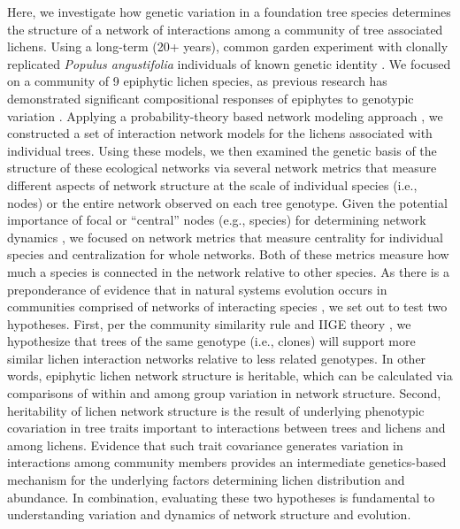 \documentclass[fleqn,12pt]{olplainarticle}
\begin{document}
Here, we investigate how genetic variation in a foundation tree
species determines the structure of a network of interactions among a
community of tree associated lichens.  Using a long-term (20+ years),
common garden experiment with clonally replicated \textit{Populus
  angustifolia} individuals of known genetic identity
\citep{Martinsen2001HybridSpecies}. We focused on a community of 9
epiphytic lichen species, as previous research has demonstrated
significant compositional responses of epiphytes to genotypic
variation \citep{Winfree2011, Zytynska2011}. Applying a
probability-theory based network modeling approach \citep{Araujo2011},
we constructed a set of interaction network models for the lichens
associated with individual trees. Using these models, we then examined
the genetic basis of the structure of these ecological networks via
several network metrics that measure different aspects of network
structure at the scale of individual species (i.e., nodes) or the
entire network observed on each tree genotype. Given the potential
importance of focal or ``central'' nodes (e.g., species) for
determining network dynamics \citep{Lieberman2005EvolutionaryGraphs},
we focused on network metrics that measure centrality for individual
species and centralization for whole networks. Both of these metrics
measure how much a species is connected in the network relative to
other species. As there is a preponderance of evidence that in natural
systems evolution occurs in communities comprised of networks of
interacting species \citep{Lau2016afix, Keith2017, Thompson2013,
  Bascompte2006}, we set out to test two hypotheses. First, per the
community similarity rule \citep{Bangert2006} and IIGE theory
\citep{Whitham2020IntraspecificEvolution}, we hypothesize that trees
of the same genotype (i.e., clones) will support more similar lichen
interaction networks relative to less related genotypes. In other
words, epiphytic lichen network structure is heritable, which can be
calculated via comparisons of within and among group variation in
network structure. Second, heritability of lichen network structure is
the result of underlying phenotypic covariation in tree traits
important to interactions between trees and lichens and among
lichens. Evidence that such trait covariance generates variation in
interactions among community members provides an intermediate
genetics-based mechanism for the underlying factors determining
lichen distribution and abundance. In combination, evaluating these
two hypotheses is fundamental to understanding variation and dynamics
of network structure and evolution.
\end{document}
